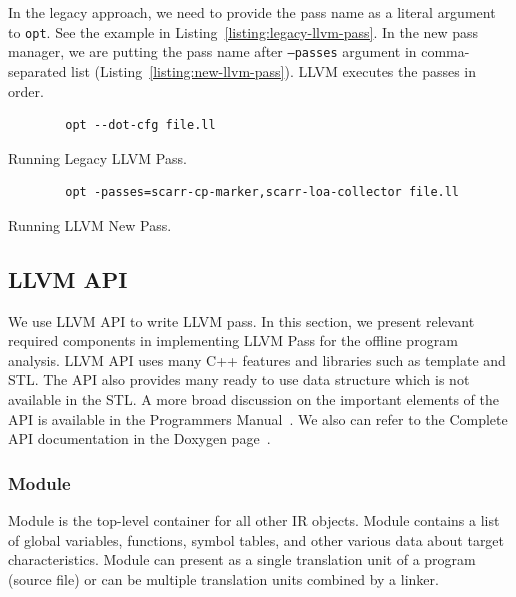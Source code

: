 In the legacy approach, we need to provide the pass name as a literal argument
to \texttt{opt}. See the example in Listing~\ref{listing:legacy-llvm-pass}. In
the new pass manager, we are putting the pass name after \texttt{--passes}
argument in comma-separated list (Listing~\ref{listing:new-llvm-pass}). LLVM
executes the passes in order.

\begin{listing}[htbp]
    \begin{verbatim}
        opt --dot-cfg file.ll 
    \end{verbatim}
    \caption{Running Legacy LLVM Pass.}    
    \label{listing:legacy-llvm-pass}
\end{listing}

\begin{listing}[htpb]
    \begin{verbatim}
        opt -passes=scarr-cp-marker,scarr-loa-collector file.ll 
    \end{verbatim}
    \caption{Running LLVM New Pass.}    
    \label{listing:new-llvm-pass}
\end{listing}

\subsection{LLVM API}

We use LLVM API to write LLVM pass. In this section, we present relevant
required components in implementing LLVM Pass for the offline program analysis.
LLVM API uses many C++ features and libraries such as template and STL. The API
also provides many ready to use data structure which is not available in the
STL. A more broad discussion on the important elements of the API is available
in the Programmers Manual~\cite{LLVMProgrammerManuala}. We also can refer to the
Complete API documentation in the Doxygen page~\cite{LLVMLLVMa}.

\subsubsection{Module}

Module is the top-level container for all other IR objects. Module contains a
list of global variables, functions, symbol tables, and other various data about
target characteristics. Module can present as a single translation unit of a
program (source file) or can be multiple translation units combined by a linker.


